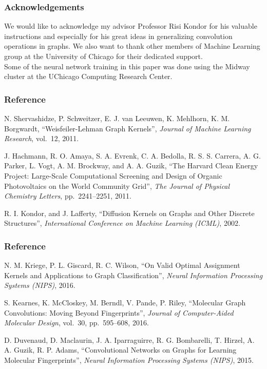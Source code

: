 \documentclass{beamer}
\begin{document}
\begin{frame}
\frametitle{Acknowledgements}
\begin{justify}
We would like to acknowledge my advisor Professor Risi Kondor for his valuable instructions and especially for his great ideas in generalizing convolution operations in graphs. We also want to thank other members of Machine Learning group at the University of Chicago for their dedicated support.
$$$$
Some of the neural network training in this paper was done using the Midway cluster at the UChicago Computing Research Center.
\end{justify}
\end{frame}

\begin{frame}
\frametitle{Reference}
\begin{justify}
\begin{thebibliography}{9}

   N. Shervashidze, P. Schweitzer, E. J. van Leeuwen, K. Mehlhorn, K. M. Borgwardt,
   ``Weisfeiler-Lehman Graph Kernels'',
   \textit{Journal of Machine Learning Research}, vol.~12, 2011.
   
   J. Hachmann, R. O. Amaya, S. A. Evrenk, C. A. Bedolla, R. S. S. Carrera, A. G. Parker, L. Vogt, A. M. Brockway, and A. A. Guzik,
   ``The Harvard Clean Energy Project: Large-Scale Computational Screening and Design of Organic Photovoltaics on the World Community Grid'',
   \textit{The Journal of Physical Chemistry Letters}, pp.~2241--2251, 2011.

   R. I. Kondor, and J. Lafferty,
   ``Diffusion Kernels on Graphs and Other Discrete Structures'',
   \textit{International Conference on Machine Learning (ICML)}, 2002.
   
\end{thebibliography}
\end{justify}
\end{frame}

\begin{frame}
\frametitle{Reference}
\begin{justify}
\begin{thebibliography}{9}

   N. M. Kriege, P. L. Giscard, R. C. Wilson,
   ``On Valid Optimal Assignment Kernels and Applications to Graph Classification'',
   \textit{Neural Information Processing Systems (NIPS)}, 2016.

   S. Kearnes, K. McCloskey, M. Berndl, V. Pande, P. Riley,
   ``Molecular Graph Convolutions: Moving Beyond Fingerprints'',
   \textit{Journal of Computer-Aided Molecular Design}, vol.~30, pp.~595--608, 2016.

   D. Duvenaud, D. Maclaurin, J. A. Iparraguirre, R. G. Bombarelli, T. Hirzel, A. A. Guzik, R. P. Adams,
   ``Convolutional Networks on Graphs for Learning Molecular Fingerprints'',
   \textit{Neural Information Processing Systems (NIPS)}, 2015.
  
\end{thebibliography}
\end{justify}
\end{frame}
\end{document}
